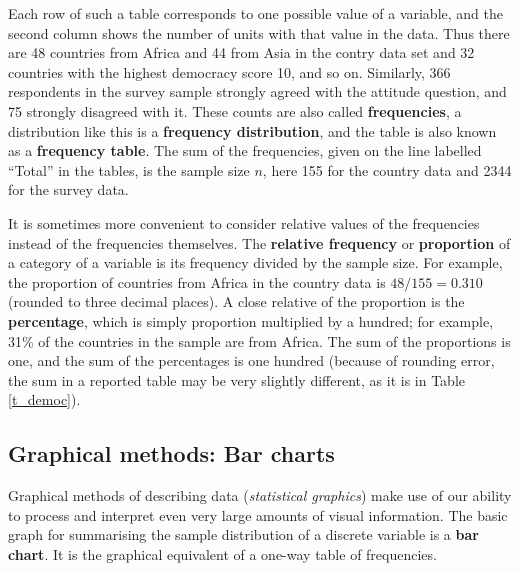 Each row of such a table corresponds to one possible value of a
variable, and the second column shows the number of units with that
value in the data. Thus there are 48 countries from Africa and 44 from
Asia in the contry data set and 32 countries with the highest democracy
score 10, and so on. Similarly, 366 respondents in the survey sample
strongly agreed with the attitude question, and 75 strongly disagreed
with it. These counts are also called \textbf{frequencies}, a
distribution like this is a \textbf{frequency distribution}, and the
table is also known as a \textbf{frequency table}. The sum of the
frequencies, given on the line labelled ``Total'' in the tables, is the
sample size $n$, here 155 for the country data and 2344 for the survey
data.


It is sometimes more convenient to
consider relative values of the frequencies instead of
the frequencies themselves. The \textbf{relative frequency} or
\textbf{proportion} of a category of a variable is its frequency divided
by the sample size. For example, the proportion of countries from Africa
in the country data is $48/155=0.310$ (rounded to three decimal places). A
close relative of the proportion is the \textbf{percentage}, which is
simply proportion multiplied by a hundred;
for example, 31\% of the countries in the sample are from Africa.
The sum of the proportions is one, and the sum of the percentages is one
hundred (because of rounding error, the sum in a reported
table may be very slightly different, as it is in Table
\ref{t_democ}).

%

\subsection{Graphical methods: Bar charts}
\label{ss_descr1_1cat_charts}

Graphical methods of describing data (\emph{statistical graphics}) make
use of our ability to process and interpret even very large amounts of
visual information. The basic graph for summarising the sample
distribution of a discrete variable is a \textbf{bar chart}. It is the
graphical equivalent of a one-way table of frequencies.


